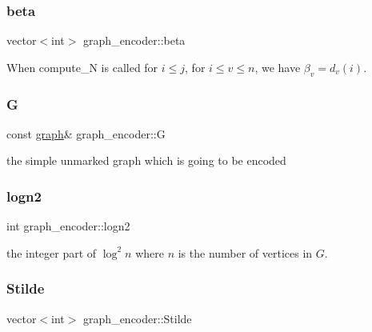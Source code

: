 \subsubsection{\texorpdfstring{beta}{beta}}
{\footnotesize\ttfamily vector$<$int$>$ graph\+\_\+encoder\+::beta\hspace{0.3cm}{\ttfamily [private]}}



When compute\+\_\+N is called for $i \leq j$, for $i \leq v \leq n$, we have $\beta_v = d_v(i)$. 

\mbox{\label{classgraph__encoder_a56d8ab1a423e192c6f80514ff5e5cfec}} 
\subsubsection{\texorpdfstring{G}{G}}
{\footnotesize\ttfamily const \hyperlink{classgraph}{graph}\& graph\+\_\+encoder\+::G\hspace{0.3cm}{\ttfamily [private]}}



the simple unmarked graph which is going to be encoded 

\mbox{\label{classgraph__encoder_a27fde3a95a280304877b1e37fc4d8553}} 
\subsubsection{\texorpdfstring{logn2}{logn2}}
{\footnotesize\ttfamily int graph\+\_\+encoder\+::logn2\hspace{0.3cm}{\ttfamily [private]}}



the integer part of $\log^2 n$ where $n$ is the number of vertices in $G$. 

\mbox{\label{classgraph__encoder_a342688a3fdee511b7fae3f155cfb10cf}} 
\subsubsection{\texorpdfstring{Stilde}{Stilde}}
{\footnotesize\ttfamily vector$<$int$>$ graph\+\_\+encoder\+::\+Stilde\hspace{0.3cm}{\ttfamily [private]}}



